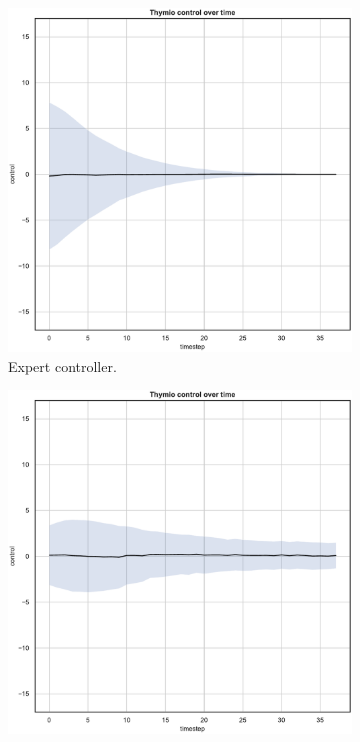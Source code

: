 \begin{figure}[!htb]
	\centering
	\begin{subfigure}[h]{0.3\textwidth}
		\centering
		\includegraphics[width=\textwidth]{contents/images/net-d18/control-overtime-omniscient}%
		\caption{Expert controller.}
	\end{subfigure}
	\hfill
	\begin{subfigure}[h]{0.3\textwidth}
		\centering
		\includegraphics[width=\textwidth]{contents/images/net-d18/control-overtime-manual}%

\end{subfigure}
\end{figure}
